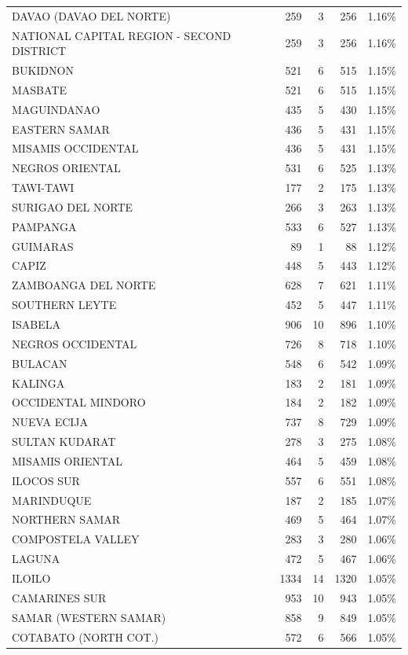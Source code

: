 \begin{tabular}{lrrrr}
DAVAO (DAVAO DEL NORTE) & 259 & 3 & 256 & 1.16\% \\
NATIONAL CAPITAL REGION - SECOND DISTRICT & 259 & 3 & 256 & 1.16\% \\
BUKIDNON & 521 & 6 & 515 & 1.15\% \\
MASBATE & 521 & 6 & 515 & 1.15\% \\
MAGUINDANAO & 435 & 5 & 430 & 1.15\% \\
EASTERN SAMAR & 436 & 5 & 431 & 1.15\% \\
MISAMIS OCCIDENTAL & 436 & 5 & 431 & 1.15\% \\
NEGROS ORIENTAL & 531 & 6 & 525 & 1.13\% \\
TAWI-TAWI & 177 & 2 & 175 & 1.13\% \\
SURIGAO DEL NORTE & 266 & 3 & 263 & 1.13\% \\
PAMPANGA & 533 & 6 & 527 & 1.13\% \\
GUIMARAS & 89 & 1 & 88 & 1.12\% \\
CAPIZ & 448 & 5 & 443 & 1.12\% \\
ZAMBOANGA DEL NORTE & 628 & 7 & 621 & 1.11\% \\
SOUTHERN LEYTE & 452 & 5 & 447 & 1.11\% \\
ISABELA & 906 & 10 & 896 & 1.10\% \\
NEGROS OCCIDENTAL & 726 & 8 & 718 & 1.10\% \\
BULACAN & 548 & 6 & 542 & 1.09\% \\
KALINGA & 183 & 2 & 181 & 1.09\% \\
OCCIDENTAL MINDORO & 184 & 2 & 182 & 1.09\% \\
NUEVA ECIJA & 737 & 8 & 729 & 1.09\% \\
SULTAN KUDARAT & 278 & 3 & 275 & 1.08\% \\
MISAMIS ORIENTAL & 464 & 5 & 459 & 1.08\% \\
ILOCOS SUR & 557 & 6 & 551 & 1.08\% \\
MARINDUQUE & 187 & 2 & 185 & 1.07\% \\
NORTHERN SAMAR & 469 & 5 & 464 & 1.07\% \\
COMPOSTELA VALLEY & 283 & 3 & 280 & 1.06\% \\
LAGUNA & 472 & 5 & 467 & 1.06\% \\
ILOILO & 1334 & 14 & 1320 & 1.05\% \\
CAMARINES SUR & 953 & 10 & 943 & 1.05\% \\
SAMAR (WESTERN SAMAR) & 858 & 9 & 849 & 1.05\% \\
COTABATO (NORTH COT.) & 572 & 6 & 566 & 1.05\% \\

\end{tabular}
